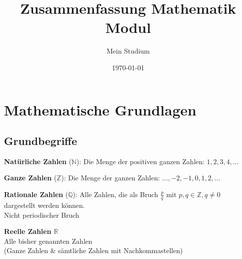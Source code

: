 \documentclass[a4paper,10pt]{article}
\begin{document}
\title{Zusammenfassung Mathematik Modul}
\author{Mein Studium}
\date{\today}
\maketitle

\tableofcontents
\newpage


\section{Mathematische Grundlagen}



\subsection{Grundbegriffe}

\begin{definitionbox}
\textbf{Natürliche Zahlen} ($\mathbb{N}$): Die Menge der positiven ganzen Zahlen: $1, 2, 3, 4, \dots$
\end{definitionbox}

\begin{definitionbox}
\textbf{Ganze Zahlen} ($\mathbb{Z}$): Die Menge der ganzen Zahlen: $\dots, -2, -1, 0, 1, 2, \dots$
\end{definitionbox}

\begin{definitionbox}
\textbf{Rationale Zahlen} ($\mathbb{Q}$): Alle Zahlen, die als Bruch $\frac{p}{q}$ mit $p, q \in \mathbb{Z}, q \neq 0$ dargestellt werden können.\\
Nicht periodischer Bruch
\end{definitionbox}

\begin{definitionbox}
\textbf{Reelle Zahlen $\mathbb{R}$} \\
Alle bisher genannten Zahlen \\
(Ganze Zahlen \& sämtliche Zahlen mit Nachkommastellen)
\end{definitionbox}
\end{document}
